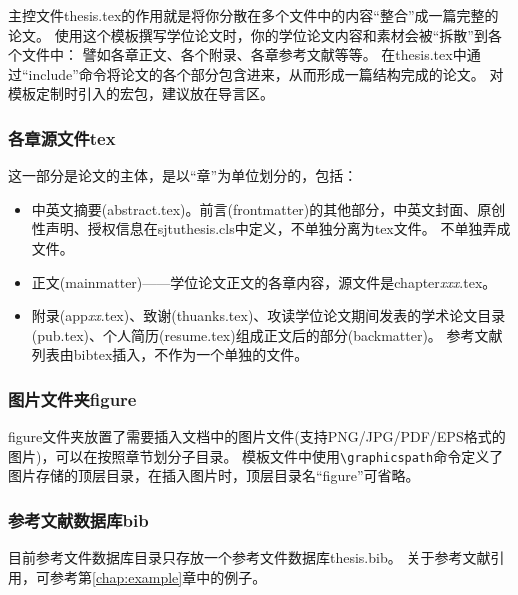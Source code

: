 主控文件thesis.tex的作用就是将你分散在多个文件中的内容“整合”成一篇完整的论文。
使用这个模板撰写学位论文时，你的学位论文内容和素材会被“拆散”到各个文件中：
譬如各章正文、各个附录、各章参考文献等等。
在thesis.tex中通过“include”命令将论文的各个部分包含进来，从而形成一篇结构完成的论文。
对模板定制时引入的宏包，建议放在导言区。

\subsubsection{各章源文件tex}
\label{sec:thesisbody}

这一部分是论文的主体，是以“章”为单位划分的，包括：

\begin{itemize}[noitemsep,topsep=0pt,parsep=0pt,partopsep=0pt]
	\item 中英文摘要(abstract.tex)。前言(frontmatter)的其他部分，中英文封面、原创性声明、授权信息在sjtuthesis.cls中定义，不单独分离为tex文件。
不单独弄成文件。
	\item 正文(mainmatter)——学位论文正文的各章内容，源文件是chapter\emph{xxx}.tex。
	\item 附录(app\emph{xx}.tex)、致谢(thuanks.tex)、攻读学位论文期间发表的学术论文目录(pub.tex)、个人简历(resume.tex)组成正文后的部分(backmatter)。
参考文献列表由bibtex插入，不作为一个单独的文件。
\end{itemize}

\subsubsection{图片文件夹figure}
\label{sec:fig}

figure文件夹放置了需要插入文档中的图片文件(支持PNG/JPG/PDF/EPS格式的图片)，可以在按照章节划分子目录。
模板文件中使用\verb|\graphicspath|命令定义了图片存储的顶层目录，在插入图片时，顶层目录名“figure”可省略。

\subsubsection{参考文献数据库bib}
\label{sec:bib}

目前参考文件数据库目录只存放一个参考文件数据库thesis.bib。
关于参考文献引用，可参考第\ref{chap:example}章中的例子。

